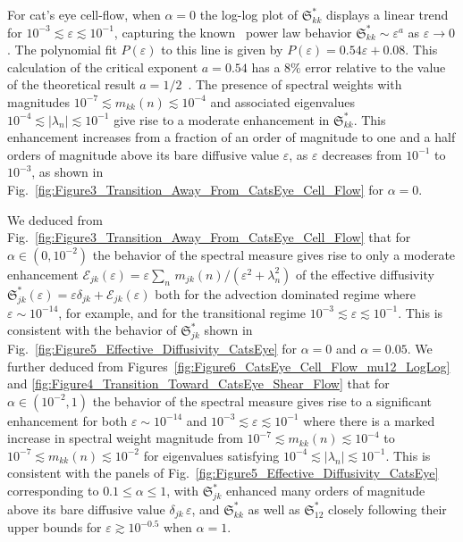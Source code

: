 \documentclass[english,12pt,jmp,graphicx]{revtex4-1}
\newcommand{\figref}[1]{Fig.~\ref{#1}}
\newcommand{\numfigref}[1]{\ref{#1}}
\newcommand{\Sg}{\mathfrak{S}}
\begin{document}
For cat's eye cell-flow, when $\alpha=0$ the log-log plot of
$\Sg_{kk}^*$ displays a linear trend for
$10^{-3}\lesssim\varepsilon\lesssim10^{-1}$, capturing the
known~\cite{Fannjiang:1994:SIAM_JAM:333,Fannjiang:1997:1033} power law 
behavior $\Sg_{kk}^*\sim\varepsilon^{a}$ as $\varepsilon\to0$. The
polynomial fit $P(\varepsilon)$ to this line is given by
$P(\varepsilon)=0.54\varepsilon+0.08$. This calculation of the
critical exponent $a=0.54$ has a $8\%$ error relative to the
value of the theoretical result
$a=1/2$~\cite{Fannjiang:1994:SIAM_JAM:333,Fannjiang:1997:1033}.
The presence  
of spectral weights with magnitudes
$10^{-7}\lesssim m_{kk}(n)\lesssim10^{-4}$
and associated eigenvalues 
$10^{-4}\lesssim|\lambda_n|\lesssim10^{-1}$
give rise to a moderate enhancement in $\Sg_{kk}^*$. This enhancement
increases from a fraction of an order of magnitude to one and a half
orders of magnitude above its bare diffusive value $\varepsilon$, as
$\varepsilon$ decreases from $10^{-1}$ to $10^{-3}$, as shown in
\figref{fig:Figure3_Transition_Away_From_CatsEye_Cell_Flow} for
$\alpha=0$.    


We deduced from 
\figref{fig:Figure3_Transition_Away_From_CatsEye_Cell_Flow} that for
$\alpha\in(0,10^{-2})$ the behavior of the spectral measure gives rise
to only a moderate enhancement  
$\mathcal{E}_{jk}(\varepsilon)=\varepsilon\sum_n\,m_{jk}(n)/(\varepsilon^2+\lambda_n^2)$
of the effective diffusivity $\Sg_{jk}^*(\varepsilon)=\varepsilon\delta_{jk} +
\mathcal{E}_{jk}(\varepsilon)$ both for the advection dominated regime
where $\varepsilon\sim10^{-14}$, for example, and for the transitional regime
$10^{-3}\lesssim\varepsilon\lesssim10^{-1}$.
This is consistent with the behavior of $\Sg^*_{jk}$ 
shown in \figref{fig:Figure5_Effective_Diffusivity_CatsEye}
for $\alpha=0$ and $\alpha=0.05$. We further deduced
from Figures~\numfigref{fig:Figure6_CatsEye_Cell_Flow_mu12_LogLog} and
\numfigref{fig:Figure4_Transition_Toward_CatsEye_Shear_Flow} that for
$\alpha\in(10^{-2},1)$ the behavior of the spectral measure
gives rise to a significant enhancement for both $\varepsilon\sim10^{-14}$
and
$10^{-3}\lesssim\varepsilon\lesssim10^{-1}$ where there is 
 a marked increase in spectral weight magnitude from
$10^{-7}\lesssim m_{kk}(n)\lesssim10^{-4}$
to
$10^{-7}\lesssim m_{kk}(n)\lesssim10^{-2}$
 for
eigenvalues satisfying
$10^{-4}\lesssim|\lambda_n|\lesssim10^{-1}$.
This is consistent with the panels of
\figref{fig:Figure5_Effective_Diffusivity_CatsEye} corresponding to
$0.1\le\alpha\le1$, with $\Sg^*_{jk}$ enhanced many orders of
magnitude above its bare diffusive value $\delta_{jk}\,\varepsilon$,
and $\Sg^*_{kk}$ as well as $\Sg^*_{12}$ closely following their upper
bounds for $\varepsilon\gtrsim10^{-0.5}$ when $\alpha=1$.  
\end{document}

